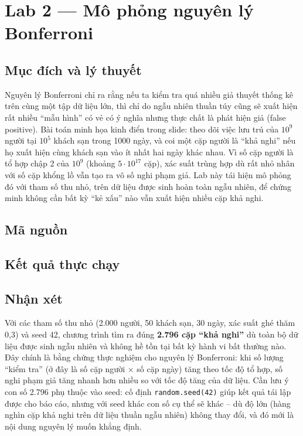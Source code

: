 \documentclass[12pt,a4paper,oneside]{article}
\begin{document}
\section{Lab 2 --- Mô phỏng nguyên lý Bonferroni}

\subsection{Mục đích và lý thuyết}

Nguyên lý Bonferroni chỉ ra rằng nếu ta kiểm tra quá nhiều giả thuyết thống kê trên cùng một tập dữ liệu lớn, thì chỉ do ngẫu nhiên thuần túy cũng sẽ xuất hiện rất nhiều ``mẫu hình'' có vẻ có ý nghĩa nhưng thực chất là phát hiện giả (false positive). Bài toán minh họa kinh điển trong slide: theo dõi việc lưu trú của $10^9$ người tại $10^5$ khách sạn trong 1000 ngày, và coi một cặp người là ``khả nghi'' nếu họ xuất hiện cùng khách sạn vào ít nhất hai ngày khác nhau. Vì số cặp người là tổ hợp chập 2 của $10^9$ (khoảng $5\cdot10^{17}$ cặp), xác suất trùng hợp dù rất nhỏ nhân với số cặp khổng lồ vẫn tạo ra vô số nghi phạm giả. Lab này tái hiện mô phỏng đó với tham số thu nhỏ, trên dữ liệu được sinh hoàn toàn ngẫu nhiên, để chứng minh không cần bất kỳ ``kẻ xấu'' nào vẫn xuất hiện nhiều cặp khả nghi.

\subsection{Mã nguồn}



\subsection{Kết quả thực chạy}



\subsection{Nhận xét}

Với các tham số thu nhỏ (2.000 người, 50 khách sạn, 30 ngày, xác suất ghé thăm 0{,}3) và seed 42, chương trình tìm ra đúng \textbf{2.796 cặp ``khả nghi''} dù toàn bộ dữ liệu được sinh ngẫu nhiên và không hề tồn tại bất kỳ hành vi bất thường nào. Đây chính là bằng chứng thực nghiệm cho nguyên lý Bonferroni: khi số lượng ``kiểm tra'' (ở đây là số cặp người $\times$ số cặp ngày) tăng theo tốc độ tổ hợp, số nghi phạm giả tăng nhanh hơn nhiều so với tốc độ tăng của dữ liệu. Cần lưu ý con số 2.796 phụ thuộc vào seed: cố định \texttt{random.seed(42)} giúp kết quả tái lập được cho báo cáo, nhưng với seed khác con số cụ thể sẽ khác -- dù độ lớn (hàng nghìn cặp khả nghi trên dữ liệu thuần ngẫu nhiên) không thay đổi, và đó mới là nội dung nguyên lý muốn khẳng định.
\end{document}
